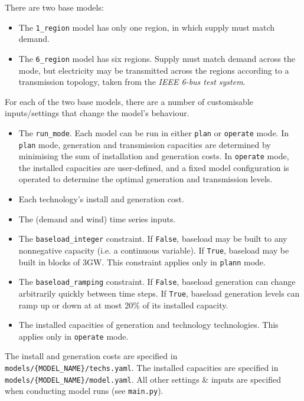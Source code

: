 \documentclass[preprint]{elsarticle}
\begin{document}
\noindent There are two base models:
\begin{itemize}
\item The \texttt{1\_region} model has only one region, in which supply must match demand.
\item The \texttt{6\_region} model has six regions. Supply must match demand across the mode, but electricity may be transmitted across the regions according to a transmission topology, taken from the \textit{IEEE 6-bus test system}.
\end{itemize}
For each of the two base models, there are a number of customisable inputs/settings that change the model's behaviour.
\begin{itemize}
\item The \texttt{run\_mode}. Each model can be run in either \texttt{plan} or \texttt{operate} mode. In \texttt{plan} mode, generation and transmission capacities are determined by minimising the sum of installation and generation costs. In \texttt{operate} mode, the installed capacities are user-defined, and a fixed model configuration is operated to determine the optimal generation and transmission levels.
\item Each technology's install and generation cost. 
\item The (demand and wind) time series inputs.
\item The \texttt{baseload\_integer} constraint. If \texttt{False}, baseload may be built to any nonnegative capacity (i.e. a continuous variable). If \texttt{True}, baseload may be built in blocks of 3GW. This constraint applies only in \texttt{plann} mode.
\item The \texttt{baseload\_ramping} constraint. If \texttt{False}, baseload generation can change arbitrarily quickly between time steps. If \texttt{True}, baseload generation levels can ramp up or down at at most 20\% of its installed capacity.
\item The installed capacities of generation and technology technologies. This applies only in \texttt{operate} mode.
\end{itemize}
The install and generation costs are specified in \texttt{models/\{MODEL\_NAME\}/techs.yaml}. The installed capacities are specified in \texttt{models/\{MODEL\_NAME\}/model.yaml}. All other settings \& inputs are specified when conducting model runs (see \texttt{main.py}).




\newpage
\end{document}
